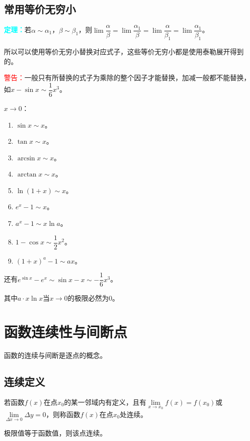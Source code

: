 \documentclass[UTF8, 12pt]{ctexart}
\begin{document}
    \subsection{常用等价无穷小}

    \textcolor{aqua}{\textbf{定理：}}若$\alpha\sim\alpha_1$，$\beta\sim\beta_1$，则$\lim\dfrac{\alpha}{\beta}=\lim\dfrac{\alpha_1}{\beta}=\lim\dfrac{\alpha}{\beta_1}=\lim\dfrac{\alpha_1}{\beta_1}$。

    所以可以使用等价无穷小替换对应式子，这些等价无穷小都是使用泰勒展开得到的。

    \textcolor{red}{警告：}一般只有所替换的式子为乘除的整个因子才能替换，加减一般都不能替换，如$x-\sin x\sim\dfrac{1}{6}x^3$。

    $x\to 0$：

    \begin{enumerate}
        \item $\sin x\sim x$。
        \item $\tan x\sim x$。
        \item $\arcsin x\sim x$。
        \item $\arctan x\sim x$。
        \item $\ln(1+x)\sim x$。
        \item $e^x-1\sim x$。
        \item $a^x-1\sim x\ln a$。
        \item $1-\cos x\sim\dfrac{1}{2}x^2$。
        \item $(1+x)^a-1\sim ax$。
    \end{enumerate}

    还有$e^{\sin x}-e^x\sim\sin x-x\sim-\dfrac{1}{6}x^3$。

    其中$a\cdot x\ln x$当$x\to 0$的极限必然为0。


    \section{函数连续性与间断点}

    函数的连续与间断是逐点的概念。

    \subsection{连续定义}

    若函数$f(x)$在点$x_0$的某一邻域内有定义，且有$\lim\limits_{x\to x_0}f(x)=f(x_0)$或$\lim\limits_{\Delta x\to 0}\Delta y=0$，则称函数$f(x)$在点$x_0$处连续。

    极限值等于函数值，则该点连续。
\end{document}
